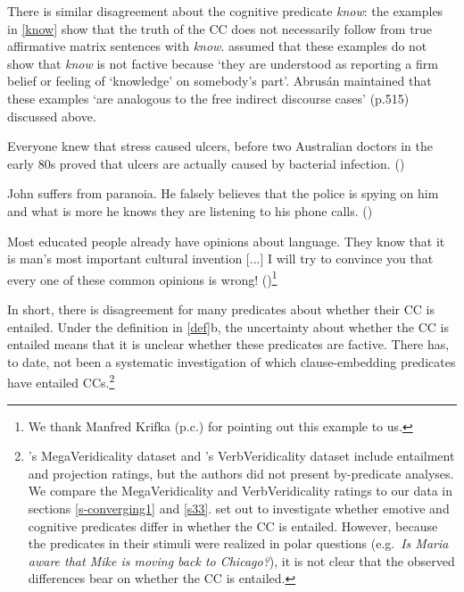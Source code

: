 \documentclass{language}
\newcommand{\6}{\mbox{$[\hspace*{-.6mm}[$}}
\newcommand{\9}{\mbox{$]\hspace*{-.6mm}]$}}
\newcommand{\citepos}[1]{\citeauthor{#1}'s \citeyear{#1}}
\begin{document}
There is similar disagreement about the cognitive predicate {\em know}: the examples in \ref{know} show that the truth of the CC does not necessarily follow from true affirmative matrix sentences with {\em know}. \citet{abrusan2011} assumed that these examples do not show that {\em know} is not factive because `they are understood as reporting a firm belief or feeling of `knowledge' on somebody's part'. Abrus\'an maintained that these examples `are analogous to the free indirect discourse cases' (p.515) discussed above.

\begin{exe}
\ex\label{know}
\begin{xlist}
\ex Everyone knew that stress caused ulcers, before two Australian doctors in the early 80s proved that ulcers are actually caused by bacterial infection. \hfill (\citealt[501]{hazlett2010})

\ex John suffers from paranoia. He falsely believes that the police is spying on him and what is more he knows they are listening to his phone calls. \hfill (\citealt[514]{abrusan2011})

\ex Most educated people already have opinions about language. They know that it is man's most important cultural invention [...] I will try to convince you that every one of these common opinions is wrong! \hfill (\citealt[17f.]{pinker94})\footnote{We thank Manfred Krifka (p.c.) for pointing out this example to us.}

\end{xlist}
\end{exe}

In short, there is disagreement for many predicates about whether their CC is entailed. Under the definition in \ref{def}b, the uncertainty about whether the CC is entailed means that it is unclear whether these predicates are factive. There has, to date, not been a systematic investigation of which clause-embedding predicates have entailed CCs.\footnote{\citepos{white-rawlins-nels2018} MegaVeridicality dataset  and \citepos{ross-pavlick2019} VerbVeridicality dataset  include entailment and projection ratings, but the authors did not present by-predicate analyses. We compare the MegaVeridicality and VerbVeridicality ratings to our data in sections \ref{s-converging1} and  \ref{s33}. \citet{djaerv-etal2016} set out to investigate whether emotive and cognitive predicates differ in whether the CC is entailed. However, because the predicates in their stimuli were realized in polar questions (e.g.\ {\em Is Maria aware that Mike is moving back to Chicago?}), it is not clear that the observed differences bear on whether the CC is entailed.} 
\end{document}
